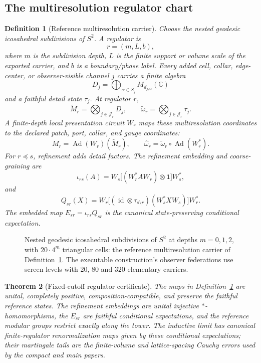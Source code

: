 \documentclass[11pt]{article}
\newtheorem{theorem}{Theorem}[section]
\newtheorem{definition}[theorem]{Definition}
\theoremstyle{remark}
\theoremstyle{plain}
\begin{document}
\subsection{The multiresolution regulator chart}

\begin{definition}[Reference multiresolution carrier]\label{def:microphysics-multiresolution-carrier}
Choose the nested geodesic icosahedral subdivisions of \(S^2\). A regulator is
\[
r=(m,L,b),
\]
where \(m\) is the subdivision depth, \(L\) is the finite support or volume scale of the exported
carrier, and \(b\) is a boundary/phase label. Every added cell, collar, edge-center, or
observer-visible channel \(j\) carries a finite algebra
\[
D_j=\bigoplus_{\alpha\in S_j}M_{d_{j,\alpha}}(\mathbb C)
\]
and a faithful detail state \(\tau_j\). At regulator \(r\),
\[
\widetilde M_r=\bigotimes_{j\in\mathcal J_r}D_j,\qquad
\widetilde\omega_r=\bigotimes_{j\in\mathcal J_r}\tau_j .
\]
A finite-depth local presentation circuit \(W_r\) maps these multiresolution coordinates to the
declared patch, port, collar, and gauge coordinates:
\[
M_r=\operatorname{Ad}(W_r)(\widetilde M_r),\qquad
\widehat\omega_r=\widetilde\omega_r\circ\operatorname{Ad}(W_r^*).
\]
For \(r\preceq s\), refinement adds detail factors. The refinement embedding and coarse-graining
are
\[
\iota_{rs}(A)=W_s\bigl[(W_r^*AW_r)\otimes\mathbf1\bigr]W_s^*,
\]
and
\[
Q_{sr}(X)=W_r\bigl[(\operatorname{id}\otimes\tau_{s\setminus r})
(W_s^*XW_s)\bigr]W_r^* .
\]
The embedded map \(E_{sr}=\iota_{rs}Q_{sr}\) is the canonical state-preserving conditional
expectation.
\end{definition}

\begin{figure}[!htb]
\centering

\caption{Nested geodesic icosahedral subdivisions of $S^2$ at depths $m=0,1,2$, with $20\cdot4^m$ triangular cells: the reference multiresolution carrier of Definition~\ref{def:microphysics-multiresolution-carrier}. The executable construction's observer federations use screen levels with $20$, $80$ and $320$ elementary carriers.}
\label{fig:screen-levels}
\end{figure}


\begin{theorem}[Fixed-cutoff regulator certificate]\label{thm:microphysics-regulator-certificate}
The maps in Definition~\ref{def:microphysics-multiresolution-carrier} are unital, completely
positive, composition-compatible, and preserve the faithful reference states. The refinement
embeddings are unital injective \(*\)-homomorphisms, the \(E_{sr}\) are faithful conditional
expectations, and the reference modular groups restrict exactly along the tower. The inductive
limit has canonical finite-regulator renormalization maps given by these conditional
expectations; their martingale tails are the finite-volume and lattice-spacing Cauchy errors used
by the compact and main papers.
\end{theorem}
\end{document}
